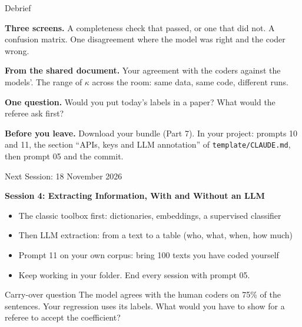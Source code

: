 
\begin{frame}{Debrief}

\textbf{Three screens.} A completeness check that passed, or one that did not. A confusion matrix. One disagreement where the model was right and the coder wrong.

\vspace{0.3cm}

\textbf{From the shared document.} Your agreement with the coders against the models'. The range of $\kappa$ across the room: same data, same code, different runs.

\vspace{0.3cm}

\textbf{One question.} Would you put today's labels in a paper? What would the referee ask first?

\vspace{0.3cm}

\textbf{Before you leave.} Download your bundle (Part 7). In your project: prompts 10 and 11, the section ``APIs, keys and LLM annotation'' of \texttt{template/CLAUDE.md}, then prompt 05 and the commit.

\end{frame}

\begin{frame}{Next Session: 18 November 2026}

\textbf{Session 4: Extracting Information, With and Without an LLM}

\vspace{0.2cm}

\begin{itemize}
    \item The classic toolbox first: dictionaries, embeddings, a supervised classifier
    \item Then LLM extraction: from a text to a table (who, what, when, how much)
    \item Prompt 11 on your own corpus: bring 100 texts you have coded yourself
    \item Keep working in your folder. End every session with prompt 05.
\end{itemize}

\vspace{0.3cm}

\begin{alertblock}{Carry-over question}
The model agrees with the human coders on 75\% of the sentences. Your regression uses its labels. What would you have to show for a referee to accept the coefficient?
\end{alertblock}

\end{frame}

